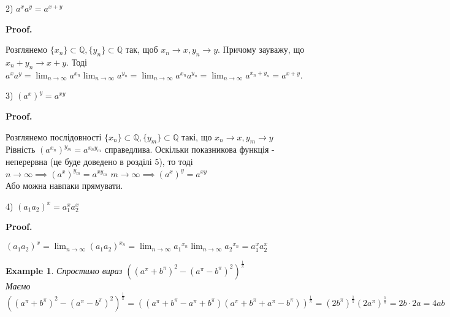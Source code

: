 \documentclass[a4paper, 14pt]{article}
\makeatletter
\def\qed{$\blacksquare$}
\theoremstyle{theoremdd}
\theoremstyle{theoremdd}
\theoremstyle{theoremdd}
\theoremstyle{theoremdd}
\newtheorem{example}[theorem]{Example}
\theoremstyle{theoremdd}
\theoremstyle{theoremdd}
\theoremstyle{theoremdd}
\theoremstyle{theoremdd}
\renewenvironment{proof}[1][Proof.\\]{\par
\pushQED{\hfill \qed}%
\normalfont \topsep6\p@\@plus6\p@\relax
\trivlist
\item\relax
{\bfseries
#1\@addpunct{.}}\hspace\labelsep\ignorespaces
}{%
\popQED\endtrivlist\@endpefalse
}
\makeatother
\begin{document}
2) $a^x a^y = a^{x+y}$
\begin{proof}
Розглянемо $\{x_n\} \subset \mathbb{Q}, \{y_n\} \subset \mathbb{Q}$ так, щоб $x_n \to x, y_n \to y$. Причому зауважу, що $x_n + y_n \to x +y$. Тоді $a^x a^y = \displaystyle\lim_{n \to \infty} a^{x_n} \displaystyle\lim_{n \to \infty} a^{y_n} = \displaystyle\lim_{n \to \infty} a^{x_n} a^{y_n} = \displaystyle\lim_{n \to \infty} a^{x_n+y_n} = a^{x+y}$.
\end{proof}

3) $(a^x)^y = a^{xy}$
\begin{proof}
\iffalse
Розглянемо $\{x_n\} \subset \mathbb{Q}, \{y_n\} \subset \mathbb{Q}$ так, щоб $x_n \to x, y_n \to y$. Зафіксуємо чотири послідовності раціональних чисел $\{q_{1n}\},\{q_{2n}\},\{q_{3n}\},\{q_{4n}\}$, щоб $q_{1n},q_{2n} \to x$, $q_{3n},q_{3n} \to y$, а також \\
$q_{1n} < x < q_{2n}$, $q_{3n} < y < q_{4n}$. Тоді\\
$a^{q_{1n}} < a^x < a^{q_{2n}}$.\\
Аза 2), маємо, що при $y > 0$ (для $y < 0$ аналогічно) маємо\\
$a^{q_{1n} q_{3n}} = (a^{q_{1n}})^{q_{3n}} < (a^{q_{1n}})^y \leq (a^x)^y \leq (a^{q_{2n}})^y < (a^{q_{2n}})^{q_{4n}} = a^{q_{2n} q_{4n}}$.\\
А тепер за теоремою про двох поліцаїв, маємо, що $(a^x)^y = a^{xy}$.
\fi
Розглянемо послідовності $\{x_n\} \subset \mathbb{Q}, \{y_m\} \subset \mathbb{Q}$ такі, що $x_n \to x, y_m \to y$\\
Рівність $(a^{x_n})^{y_m} = a^{x_n y_m}$ справедлива. Оскільки показникова функція - неперервна (це буде доведено в розділі 5), то тоді\\
$n \to \infty \implies (a^x)^{y_m} = a^{x y_m}$ \hspace{0.5cm} $m \to \infty \implies (a^x)^{y} = a^{xy}$\\
Або можна навпаки прямувати.
\end{proof}

4) $(a_1a_2)^x = a_1^x a_2^x$
\begin{proof}
$(a_1a_2)^x = \displaystyle\lim_{n \to \infty} (a_1a_2)^{x_n} = \displaystyle\lim_{n \to \infty} {a_1}^{x_n} \displaystyle\lim_{n \to \infty} {a_2}^{x_n} = a_1^x a_2^x$
\end{proof}

\begin{example}
Спростимо вираз $\left((a^\pi+b^\pi)^2-(a^\pi-b^\pi)^2 \right)^{\frac{1}{\pi}}$\\
Маємо $\left((a^\pi+b^\pi)^2-(a^\pi-b^\pi)^2 \right)^{\frac{1}{\pi}} = ((a^\pi+b^\pi-a^\pi+b^\pi)(a^\pi+b^\pi+a^\pi-b^\pi))^{\frac{1}{\pi}} = (2b^{\pi})^{\frac{1}{\pi}}(2a^{\pi})^{\frac{1}{\pi}} = 2b \cdot 2a = 4ab$
\bigskip \\
\end{example}
\end{document}
